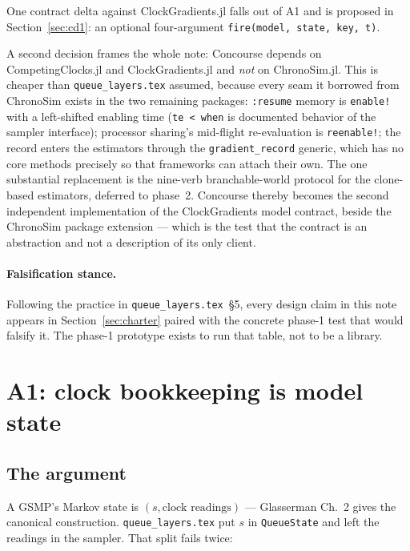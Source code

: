 \documentclass[11pt]{article}
\newcommand{\code}[1]{\texttt{#1}}
\begin{document}
One contract delta against ClockGradients.jl falls out of A1 and is proposed
in Section~\ref{sec:cd1}: an optional four-argument
\code{fire(model, state, key, t)}.

A second decision frames the whole note: Concourse depends on
CompetingClocks.jl and ClockGradients.jl and \emph{not} on ChronoSim.jl.
This is cheaper than \code{queue\_layers.tex} assumed, because every seam it
borrowed from ChronoSim exists in the two remaining packages:
\code{:resume} memory is \code{enable!} with a left-shifted enabling time
(\code{te < when} is documented behavior of the sampler interface);
processor sharing's mid-flight re-evaluation is \code{reenable!}; the record
enters the estimators through the \code{gradient\_record} generic, which has
no core methods precisely so that frameworks can attach their own. The one
substantial replacement is the nine-verb branchable-world protocol for the
clone-based estimators, deferred to phase~2. Concourse thereby becomes the
second independent implementation of the ClockGradients model contract,
beside the ChronoSim package extension --- which is the test that the
contract is an abstraction and not a description of its only client.

\paragraph{Falsification stance.} Following the practice in
\code{queue\_layers.tex}~\S5, every design claim in this note appears in
Section~\ref{sec:charter} paired with the concrete phase-1 test that would
falsify it. The phase-1 prototype exists to run that table, not to be a
library.

\section{A1: clock bookkeeping is model state}
\label{sec:a1}

\subsection{The argument}

A GSMP's Markov state is $(s, \text{clock readings})$ --- Glasserman Ch.~2
gives the canonical construction. \code{queue\_layers.tex} put $s$ in
\code{QueueState} and left the readings in the sampler. That split fails
twice:
\end{document}
